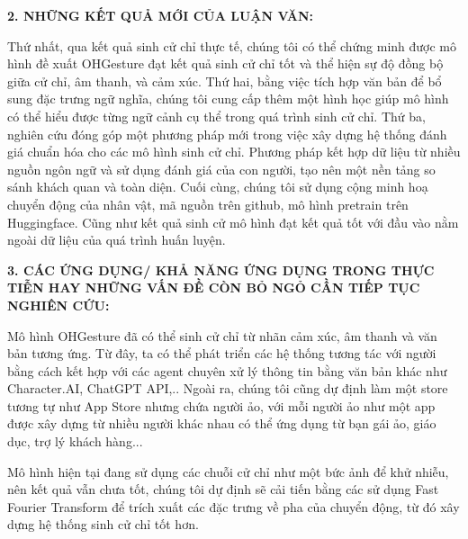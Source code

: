 \vspace{5pt}
{\MakeUppercase \Large \bfseries 2. NHỮNG KẾT QUẢ MỚI CỦA LUẬN VĂN:}


Thứ nhất, qua kết quả sinh cử chỉ thực tế, chúng tôi có thể chứng minh được mô hình đề xuất OHGesture đạt kết quả sinh cử chỉ tốt và thể hiện sự độ đồng bộ giữa cử chỉ, âm thanh, và cảm xúc.
Thứ hai, bằng việc tích hợp văn bản để bổ sung đặc trưng ngữ nghĩa, chúng tôi cung cấp thêm một hình học giúp mô hình có thể hiểu được từng ngữ cảnh cụ thể trong quá trình sinh cử chỉ.
Thứ ba, nghiên cứu đóng góp một phương pháp mới trong việc xây dựng hệ thống đánh giá chuẩn hóa cho các mô hình sinh cử chỉ. Phương pháp kết hợp dữ liệu từ nhiều nguồn ngôn ngữ và sử dụng đánh giá của con người, tạo nên một nền tảng so sánh khách quan và toàn diện.
Cuối cùng, chúng tôi sử dụng cộng minh hoạ chuyển động của nhân vật, mã nguồn trên github, mô hình pretrain trên Huggingface. Cũng như kết quả sinh cử mô hình đạt kết quả tốt với đầu vào nằm ngoài dữ liệu của quá trình huấn luyện.

\vspace{5pt}
{\MakeUppercase \Large \bfseries 3. CÁC ỨNG DỤNG/ KHẢ NĂNG ỨNG DỤNG TRONG THỰC TIỄN HAY NHỮNG VẤN ĐỀ CÒN BỎ NGỎ CẦN TIẾP TỤC NGHIÊN CỨU:}


Mô hình OHGesture đã có thể sinh cử chỉ từ nhãn cảm xúc, âm thanh và văn bản tương ứng.
Từ đây, ta có thể phát triển các hệ thống tương tác với người bằng cách kết hợp với các agent chuyên xử lý thông tin bằng văn bản khác như Character.AI, ChatGPT API,.. Ngoài ra, chúng tôi cũng dự định làm một store tương tự như App Store nhưng chứa người ảo, với mỗi người ảo như một app được xây dựng từ nhiều người khác nhau có thể ứng dụng từ bạn gái ảo, giáo dục, trợ lý khách hàng...

Mô hình hiện tại đang sử dụng các chuỗi cử chỉ như một bức ảnh để khử nhiễu, nên kết quả vẫn chưa tốt, chúng tôi dự định sẽ cải tiến bằng các sử dụng Fast Fourier Transform để trích xuất các đặc trưng về pha của chuyển động, từ đó xây dựng hệ thống sinh cử chỉ tốt hơn.


